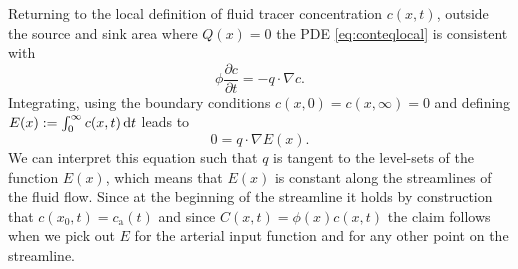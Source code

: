 \documentclass[journal,twocolumn]{IEEEtran}
\newcommand{\ca}{c_\mathrm{a}}
\begin{document}
	Returning to the local definition of fluid tracer concentration $c(x,t)$, outside the source and sink area where $Q(x)=0$ the PDE \eqref{eq:conteqlocal} is consistent with
	\begin{equation}
		\phi\frac{\partial c}{\partial t}  = - q \cdot \nabla c.
		\label{eq:1cmodel}
	\end{equation}
	Integrating, using the boundary conditions $c(x,0) = c(x,\infty) = 0$ and defining $E(x):= \int_0^\infty c(x,t) \,\mathrm{d} t$ leads to
	\begin{equation}
		0 = q \cdot \nabla  E(x).
		\label{eq:streamlinezero}
	\end{equation}
	We can interpret this equation such that $q$ is tangent to the level-sets of the function $E(x)$, which means that $E(x)$ is constant along the streamlines of the fluid flow.
	Since at the beginning of the streamline it holds by construction that $c(x_0,t) = \ca(t)$ and since $C(x,t) = \phi(x) c(x,t)$ the claim follows when we pick out $E$ for the arterial input function and for any other point on the streamline.
	
\end{document}
